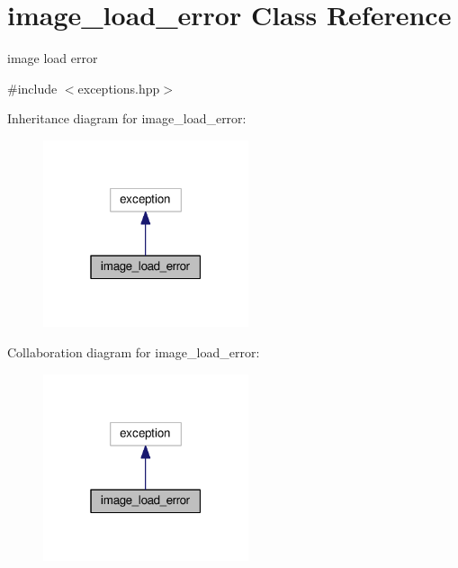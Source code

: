 \hypertarget{classimage__load__error}{}\section{image\+\_\+load\+\_\+error Class Reference}
\label{classimage__load__error}


image load error  




{\ttfamily \#include $<$exceptions.\+hpp$>$}



Inheritance diagram for image\+\_\+load\+\_\+error\+:\nopagebreak
\begin{figure}[H]
\begin{center}
\leavevmode
\includegraphics[width=171pt]{classimage__load__error__inherit__graph}
\end{center}
\end{figure}


Collaboration diagram for image\+\_\+load\+\_\+error\+:\nopagebreak
\begin{figure}[H]
\begin{center}
\leavevmode
\includegraphics[width=171pt]{classimage__load__error__coll__graph}
\end{center}
\end{figure}
